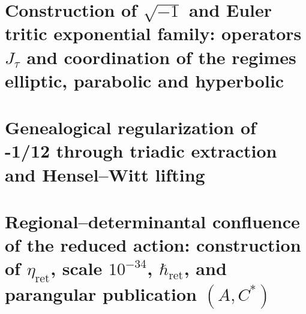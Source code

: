 \chapter{Construction of \texorpdfstring{\(\sqrt{-1}\)}{√(−1)} and Euler tritic exponential family: operators \texorpdfstring{\(J_\tau\)}{J_τ} and coordination of the regimes elliptic, parabolic and hyperbolic}
\label{chap:sucesor-102-12}



\chapter{Genealogical regularization of -1/12 through triadic extraction and Hensel–Witt lifting}
\label{chap:sucesor-102-13}


\chapter{Regional--determinantal confluence of the reduced action: construction of \texorpdfstring{\(\eta_{\mathrm{ret}}\)}{η_ret}, scale \texorpdfstring{\(10^{-34}\)}{10⁻³⁴}, \texorpdfstring{\(\hbar_{\mathrm{ret}}\)}{ℏ_ret}, and parangular publication \texorpdfstring{\((A,C^*)\)}{(A,C*)}}
\label{chap:sucesor-102-14}























